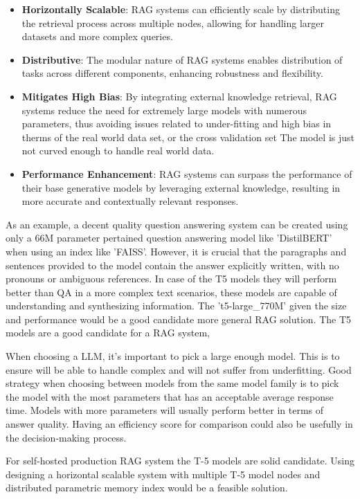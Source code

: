 \documentclass{wseas}
\begin{document}
\begin{itemize}
\item
  \textbf{Horizontally Scalable}: RAG systems can efficiently scale by
  distributing the retrieval process across multiple nodes, allowing for
  handling larger datasets and more complex queries.
\item
  \textbf{Distributive}: The modular nature of RAG systems enables
  distribution of tasks across different components, enhancing
  robustness and flexibility.
\item
  \textbf{Mitigates High Bias}: By integrating external knowledge
  retrieval, RAG systems reduce the need for extremely large models with
  numerous parameters, thus avoiding issues related to under-fitting and
  high bias in therms of the real world data set, or the cross
  validation set The model is just not curved enough to handle real
  world data.
\item
  \textbf{Performance Enhancement}: RAG systems can surpass the
  performance of their base generative models by leveraging external
  knowledge, resulting in more accurate and contextually relevant
  responses.
\end{itemize}

As an example, a decent quality question answering system can be created
using only a 66M parameter pertained question answering model like
'DistilBERT' when using an index like 'FAISS'. However, it is crucial that
the paragraphs and sentences provided to the model contain the answer
explicitly written, with no pronouns or ambiguous references. In case of
the T5 models they will perform better than QA in a more complex text
scenarios, these models are capable of understanding and synthesizing
information. The 't5-large\_770M' given the size and performance would be
a good candidate more general RAG solution. The T5 models are a good candidate for a RAG system,

When choosing a LLM, it's important to pick a large enough model. 
This is to ensure will be able to handle complex and will not suffer from underfitting. 
Good strategy when choosing between models from
the same model family is to pick the model with the most parameters 
that has an acceptable average response time. Models with more parameters will 
usually perform better in terms of answer quality. Having an efficiency score for 
comparison could also be usefully in the decision-making process.

For self-hosted production RAG system the T-5 models 
are solid candidate. Using designing a horizontal scalable system with
multiple T-5 model nodes and distributed parametric memory index would be
a feasible solution.
\end{document}
